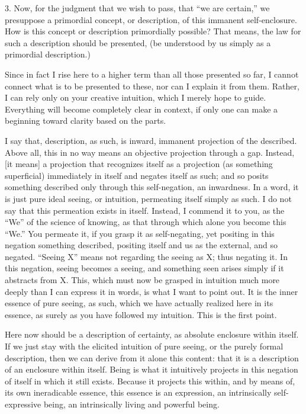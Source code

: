 3. Now, for the judgment
that we wish to pass,
that “we are certain,”
we presuppose a primordial concept, or description,
of this immanent self-enclosure.
How is this concept or description primordially possible?
That means, the law for such a description should be presented,
(be understood by us simply as a primordial description.)

Since in fact I rise here to a higher term
than all those presented so far,
I cannot connect what is to be presented to these,
nor can I explain it from them.
Rather, I can rely only on your creative intuition,
which I merely hope to guide.
Everything will become completely clear in context,
if only one can make a beginning toward clarity
based on the parts.

I say that, description, as such,
is inward, immanent projection of the described.
Above all, this in no way means
an objective projection through a gap.
Instead, [it means] a projection
that recognizes itself as a projection
(as something superficial)
immediately in itself
and negates itself as such;
and so posits something described
only through this self-negation,
an inwardness.
In a word, it is just pure ideal seeing,
or intuition, permeating itself simply as such.
I do not say that this permeation exists in itself.
Instead, I commend it to you,
as the “We” of the science of knowing,
as that through which alone you become this “We.”
You permeate it, if you grasp it as self-negating,
yet positing in this negation something described,
positing itself and us as the external, and so negated.
“Seeing X” means not regarding the seeing as X;
thus negating it.
In this negation, seeing becomes a seeing,
and something seen arises simply
if it abstracts from X.
This, which must now be grasped in intuition
much more deeply than I can express it in words,
is what I want to point out.
It is the inner essence of pure seeing, as such,
which we have actually realized here in its essence,
as surely as you have followed my intuition.
This is the first point.

Here now should be a description of certainty,
as absolute enclosure within itself.
If we just stay with the elicited intuition of pure seeing,
or the purely formal description,
then we can derive from it alone this content:
that it is a description of an enclosure within itself.
Being is what it intuitively projects
in this negation of itself in which it still exists.
Because it projects this within, and by means of,
its own ineradicable essence, this essence is an expression,
an intrinsically self-expressive being,
an intrinsically living and powerful being.

